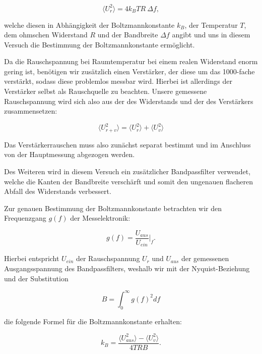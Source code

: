 \documentclass{article}
\begin{document}
\begin{equation}
    \langle U_r^2 \rangle = 4 k_B T R \ \Delta f,
\end{equation}

welche diesen in Abhängigkeit der Boltzmannkonstante $k_B$, der Temperatur $T$, dem ohmschen Widerstand $R$ und der Bandbreite $\Delta f$ angibt und uns in diesem Versuch die Bestimmung der Boltzmannkonstante ermöglicht.

Da die Rauschspannung bei Raumtemperatur bei einem realen Widerstand enorm gering ist, benötigen wir zusätzlich einen Verstärker, der diese um das 1000-fache verstärkt, sodass diese problemlos messbar wird. Hierbei ist allerdings der Verstärker selbst als Rauschquelle zu beachten. Unsere gemessene Rauschspannung wird sich also aus der des Widerstands und der des Verstärkers zusammensetzen:

\begin{equation}
    \langle U_{r+v}^2 \rangle = \langle U_r^2 \rangle + \langle U_v^2 \rangle
\end{equation}

Das Verstärkerrauschen muss also zunächst separat bestimmt und im Anschluss von der Hauptmessung abgezogen werden. 

Des Weiteren wird in diesem Versuch ein zusätzlicher Bandpassfilter verwendet, welche die Kanten der Bandbreite verschärft und somit den ungenauen flacheren Abfall des Widerstands verbessert. 

Zur genauen Bestimmung der Boltzmannkonstante betrachten wir den Frequenzgang $g(f)$ der Messelektronik:

\begin{equation}
    g(f) = \frac{U_{aus}}{U_{ein}} \bigg|_f .
\end{equation}

Hierbei entspricht $U_{ein}$ der Rauschspannung $U_r$ und $U_{aus}$ der gemessenen Ausgangsspannung des Bandpassfilters, weshalb wir mit der Nyquist-Beziehung und der Substitution

\begin{equation}
    B = \int_{0}^{\infty} g(f)^2 df
\end{equation}

die folgende Formel für die Boltzmannkonstante erhalten:

\begin{equation}
    k_B = \frac{\langle U_{aus}^2 \rangle - \langle U_{v}^2 \rangle}{4 T R B}.
    \label{eq:Boltzmann}
\end{equation}
\end{document}
